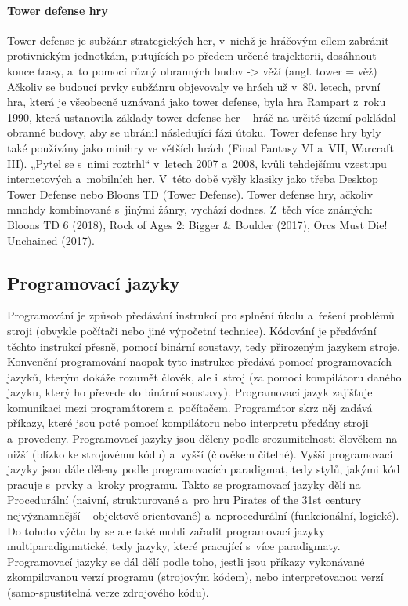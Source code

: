 \documentclass[a4paper]{extarticle}
\begin{document}
\paragraph{Tower defense hry}
Tower defense je subžánr strategických her, v~nichž je hráčovým cílem zabránit protivnickým jednotkám, putujících po předem určené trajektorii, dosáhnout konce trasy, a~to pomocí různý obranných budov -> věží (angl. tower = věž)
Ačkoliv se budoucí prvky subžánru objevovaly ve hrách už v~80. letech, první hra, která je všeobecně uznávaná jako tower defense, byla hra Rampart z~roku 1990, která ustanovila základy tower defense her – hráč na určité území pokládal obranné budovy, aby se ubránil následující fázi útoku. Tower defense hry byly také používány jako minihry ve větších hrách (Final Fantasy VI a~VII, Warcraft III). „Pytel se s~nimi roztrhl“ v~letech 2007 a~2008, kvůli tehdejšímu vzestupu internetových a~mobilních her. V~této době vyšly klasiky jako třeba Desktop Tower Defense nebo Bloons TD (Tower Defense).
Tower defense hry, ačkoliv mnohdy kombinované s~jinými žánry, vychází dodnes. Z~těch více známých: Bloons TD 6 (2018), Rock of Ages 2: Bigger \& Boulder (2017), Orcs Must Die! Unchained (2017).
\subsection{Programovací jazyky}
Programování je způsob předávání instrukcí pro splnění úkolu a~řešení problémů stroji (obvykle počítači nebo jiné výpočetní technice). Kódování je předávání těchto instrukcí přesně, pomocí binární soustavy, tedy přirozeným jazykem stroje. Konvenční programování naopak tyto instrukce předává pomocí programovacích jazyků, kterým dokáže rozumět člověk, ale i~stroj (za pomoci kompilátoru daného jazyku, který ho převede do binární soustavy).
Programovací jazyk zajišťuje komunikaci mezi programátorem a~počítačem. Programátor skrz něj zadává příkazy, které jsou poté pomocí kompilátoru nebo interpretu předány stroji a~provedeny. 
Programovací jazyky jsou děleny podle srozumitelnosti člověkem na nižší (blízko ke strojovému kódu) a~vyšší (člověkem čitelné). 
Vyšší programovací jazyky jsou dále děleny podle programovacích paradigmat, tedy stylů, jakými kód pracuje s~prvky a~kroky programu. Takto se programovací jazyky dělí na Procedurální (naivní, strukturované a~pro hru Pirates of the 31st century nejvýznamnější – objektově orientované) a~neprocedurální (funkcionální, logické). Do tohoto výčtu by se ale také mohli zařadit programovací jazyky multiparadigmatické, tedy jazyky, které pracující s~více paradigmaty.
Programovací jazyky se dál dělí podle toho, jestli jsou příkazy vykonávané zkompilovanou verzí programu (strojovým kódem), nebo interpretovanou verzí (samo-spustitelná verze zdrojového kódu).
\end{document}
